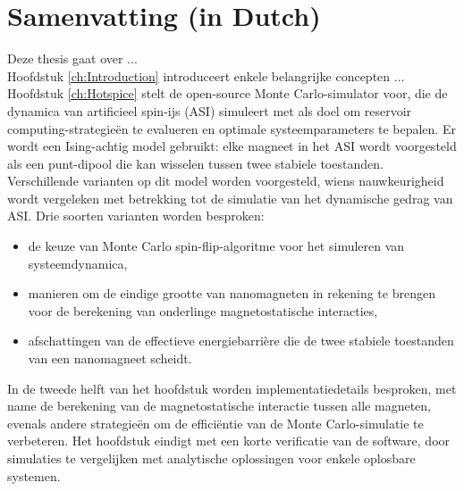 \chapter*{Samenvatting (in Dutch)}

Deze thesis gaat over ... \\

Hoofdstuk \ref{ch:Introduction} introduceert enkele belangrijke concepten ... \\

Hoofdstuk \ref{ch:Hotspice} stelt de open-source \hotspice Monte Carlo-simulator voor, die de dynamica van artificieel spin-ijs (ASI) simuleert met als doel om reservoir computing-strategie\"en te evalueren en optimale systeemparameters te bepalen.
Er wordt een Ising-achtig model gebruikt: elke magneet in het ASI wordt voorgesteld als een punt-dipool die kan wisselen tussen twee stabiele toestanden.
Verschillende varianten op dit model worden voorgesteld, wiens nauwkeurigheid wordt vergeleken met betrekking tot de simulatie van het dynamische gedrag van ASI.
Drie soorten varianten worden besproken:
\begin{itemize}[noitemsep,nolistsep] %
	\item de keuze van Monte Carlo spin-flip-algoritme voor het simuleren van systeemdynamica,
	\item manieren om de eindige grootte van nanomagneten in rekening te brengen voor de berekening van onderlinge magnetostatische interacties,
	\item afschattingen van de effectieve energiebarri\`ere die de twee stabiele toestanden van een nanomagneet scheidt.
\end{itemize}
In de tweede helft van het hoofdstuk worden implementatiedetails besproken, met name de berekening van de magnetostatische interactie tussen alle magneten, evenals andere strategie\"en om de effici\"entie van de Monte Carlo-simulatie te verbeteren.
Het hoofdstuk eindigt met een korte verificatie van de software, door simulaties te vergelijken met analytische oplossingen voor enkele oplosbare systemen. \\

